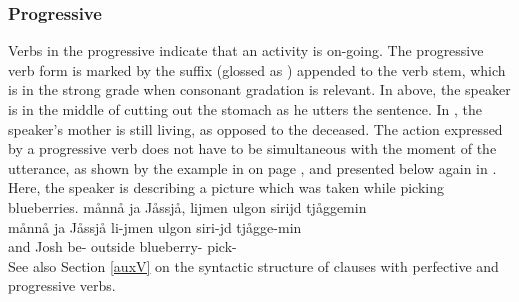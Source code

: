 \subsubsection{Progressive}\label{progressiveAspect}
Verbs in the progressive indicate that an activity is on-going. The progressive verb form is marked by the suffix  (glossed as \PROGs) appended to the verb stem, which is in the strong grade when consonant gradation is relevant. %
In  above, the speaker is in the middle of cutting out the stomach as he utters the sentence. In , the speaker’s mother is still living, as opposed to the deceased. 
The action expressed by a progressive verb does not have to be simultaneous with the moment of the utterance, as shown by the %
example in  on page \pageref{inflectionalCatsVerbsEx2}, and presented below again in . Here, the speaker is describing a picture which was taken while picking blueberries. 
\ea\label{inflectionalCatsVerbsEx2b}%
\glll	månnå ja Jåssjå, lijmen ulgon sirijd tjåggemin\\
	månnå ja Jåssjå li-jmen ulgon siri-jd tjågge-min\\
	 and Josh\BS{} be- outside blueberry- pick-\\\nopagebreak
{}	
\z
See also Section \ref{auxV} on the syntactic structure of clauses with perfective and progressive verbs. 



